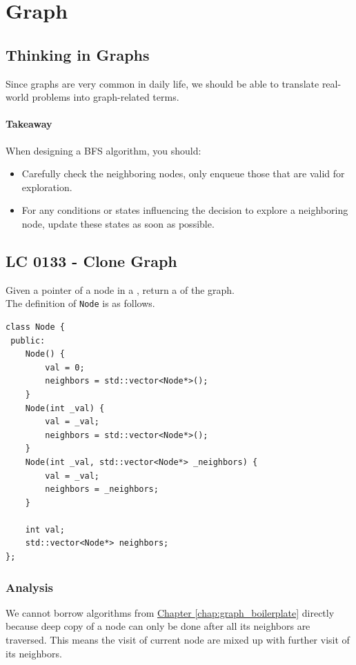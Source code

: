 \chapter{Graph}
\section{Thinking in Graphs}
Since graphs are very common in daily life, we should be able to translate real-world problems into graph-related terms.

\subsubsection*{Takeaway}
When designing a BFS algorithm, you should:
\begin{itemize}
\item Carefully check the neighboring nodes, only enqueue those that are valid for exploration.
\item For any conditions or states influencing the decision to explore a neighboring node, update these states as soon as possible.
\end{itemize}

\section{LC 0133 - Clone Graph}\label{lc0133}
Given a pointer of a node in a {\color{blue}{connected undirected graph}}, return a {\color{blue}{deep copy}} of the graph. \\

The definition of {\colorbox{CodeBackground}{\lstinline|Node|}} is as follows.
\begin{lstlisting}
class Node {
 public:
	Node() {
		val = 0;
		neighbors = std::vector<Node*>();
	}
	Node(int _val) {
		val = _val;
		neighbors = std::vector<Node*>();
	}
	Node(int _val, std::vector<Node*> _neighbors) {
		val = _val;
		neighbors = _neighbors;
	}
	
	int val;
	std::vector<Node*> neighbors;
};
\end{lstlisting}

\subsection*{Analysis}
We cannot borrow algorithms from
\hyperref[chap:graph_boilerplate]{Chapter \ref{chap:graph_boilerplate}} directly because deep copy of a node can only be done after all its neighbors are traversed. This means the visit of current node are mixed up with further visit of its neighbors.

